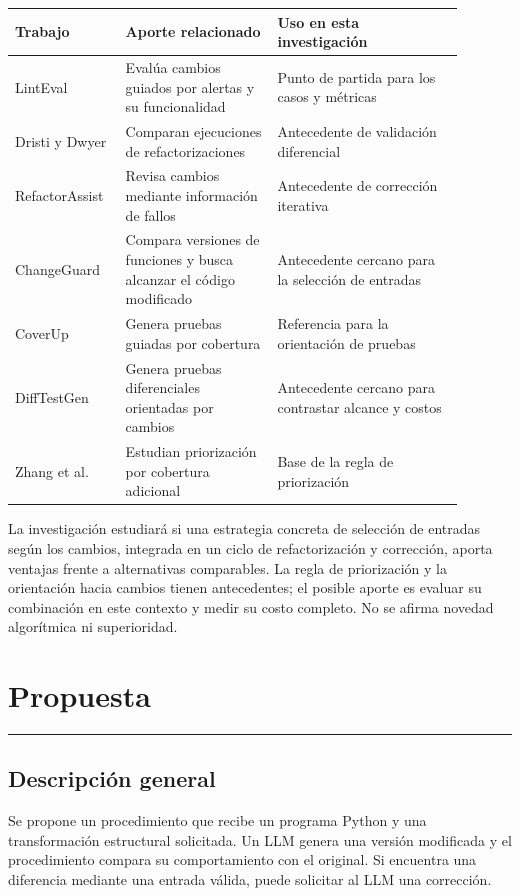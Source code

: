 \documentclass[11pt,openright,final]{unsa}
\begin{document}
\begin{longtable}{p{0.20\linewidth}p{0.31\linewidth}p{0.38\linewidth}}
Trabajo & Aporte relacionado & Uso en esta investigación \\
\hline
LintEval \cite{ref1} & Evalúa cambios guiados por alertas y su funcionalidad & Punto de partida para los casos y métricas \\
Dristi y Dwyer \cite{ref2} & Comparan ejecuciones de refactorizaciones & Antecedente de validación diferencial \\
RefactorAssist \cite{ref3} & Revisa cambios mediante información de fallos & Antecedente de corrección iterativa \\
ChangeGuard \cite{ref4} & Compara versiones de funciones y busca alcanzar el código modificado & Antecedente cercano para la selección de entradas \\
CoverUp \cite{ref5} & Genera pruebas guiadas por cobertura & Referencia para la orientación de pruebas \\
DiffTestGen \cite{ref8} & Genera pruebas diferenciales orientadas por cambios & Antecedente cercano para contrastar alcance y costos \\
Zhang et al. \cite{ref9} & Estudian priorización por cobertura adicional & Base de la regla de priorización \\
\end{longtable}

La investigación estudiará si una estrategia concreta de selección de entradas según los cambios, integrada en un ciclo de refactorización y corrección, aporta ventajas frente a alternativas comparables. La regla de priorización y la orientación hacia cambios tienen antecedentes; el posible aporte es evaluar su combinación en este contexto y medir su costo completo. No se afirma novedad algorítmica ni superioridad.

\chapter{Propuesta}
\hrule\bigskip\vspace*{1cm}

\section{Descripción general}

Se propone un procedimiento que recibe un programa Python y una transformación estructural solicitada. Un LLM genera una versión modificada y el procedimiento compara su comportamiento con el original. Si encuentra una diferencia mediante una entrada válida, puede solicitar al LLM una corrección.
\end{document}
